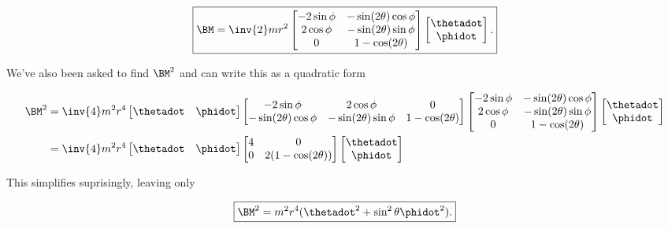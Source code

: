 \begin{equation}\label{eqn:classicalMechanicsPs2:50}
\boxed{
\BM =
\inv{2} m r^2
\begin{bmatrix}
-  2 \sin\phi & - \sin(2\theta) \cos\phi \\
  2 \cos\phi & - \sin(2\theta) \sin\phi \\
0 & 1 - \cos(2\theta)
\end{bmatrix}
\begin{bmatrix}
\thetadot \\
\phidot
\end{bmatrix}.
}
\end{equation}

We've also been asked to find $\BM^2$ and can write this as a quadratic form

\begin{align*}
\BM^2
&=
\inv{4} m^2 r^4
\begin{bmatrix}
\thetadot & \phidot
\end{bmatrix}
\begin{bmatrix}
-  2 \sin\phi  & 2 \cos\phi  & 0 \\
- \sin(2\theta) \cos\phi & - \sin(2\theta) \sin\phi  & 1 - \cos(2\theta)
\end{bmatrix}
\begin{bmatrix}
-  2 \sin\phi & - \sin(2\theta) \cos\phi \\
  2 \cos\phi & - \sin(2\theta) \sin\phi \\
0 & 1 - \cos(2\theta)
\end{bmatrix}
\begin{bmatrix}
\thetadot \\
\phidot
\end{bmatrix} \\
&=
\inv{4} m^2 r^4
\begin{bmatrix}
\thetadot & \phidot
\end{bmatrix}
\begin{bmatrix}
4 & 0 \\
0 & 2(1 - \cos(2\theta))
\end{bmatrix}
\begin{bmatrix}
\thetadot \\
\phidot
\end{bmatrix}  \\
\end{align*}

This simplifies suprisingly, leaving only

\begin{equation}\label{eqn:classicalMechanicsPs2:70}
\boxed{
\BM^2
=
m^2 r^4 ( \thetadot^2 + \sin^2\theta \phidot^2 ).
}
\end{equation}


